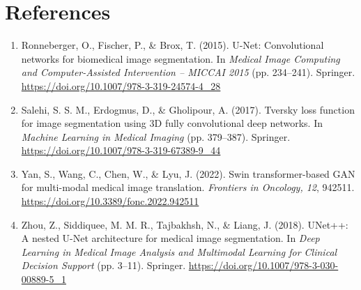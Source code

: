 \documentclass[10pt]{article}
\begin{document}
\section*{References}
\footnotesize
\begin{enumerate}
\item Ronneberger, O., Fischer, P., \& Brox, T. (2015). U-Net: Convolutional networks for biomedical image segmentation. In \textit{Medical Image Computing and Computer-Assisted Intervention -- MICCAI 2015} (pp. 234--241). Springer. \url{https://doi.org/10.1007/978-3-319-24574-4_28}
\item Salehi, S. S. M., Erdogmus, D., \& Gholipour, A. (2017). Tversky loss function for image segmentation using 3D fully convolutional deep networks. In \textit{Machine Learning in Medical Imaging} (pp. 379--387). Springer. \url{https://doi.org/10.1007/978-3-319-67389-9_44}
\item Yan, S., Wang, C., Chen, W., \& Lyu, J. (2022). Swin transformer-based GAN for multi-modal medical image translation. \textit{Frontiers in Oncology, 12}, 942511. \url{https://doi.org/10.3389/fonc.2022.942511}
\item Zhou, Z., Siddiquee, M. M. R., Tajbakhsh, N., \& Liang, J. (2018). UNet++: A nested U-Net architecture for medical image segmentation. In \textit{Deep Learning in Medical Image Analysis and Multimodal Learning for Clinical Decision Support} (pp. 3--11). Springer. \url{https://doi.org/10.1007/978-3-030-00889-5_1}
\end{enumerate}
\end{document}
